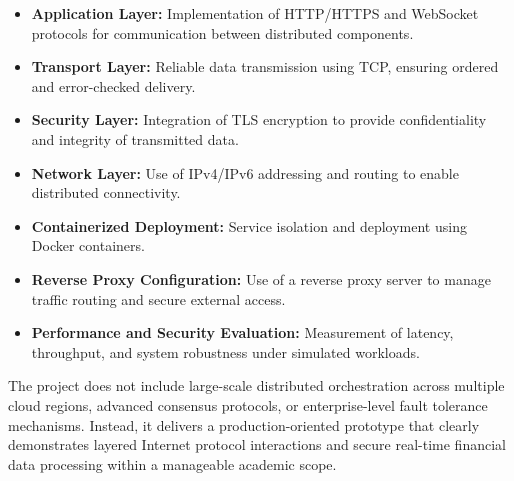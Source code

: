 \begin{itemize}
    \item \textbf{Application Layer:} Implementation of HTTP/HTTPS and WebSocket protocols for communication between distributed components.
    \item \textbf{Transport Layer:} Reliable data transmission using TCP, ensuring ordered and error-checked delivery.
    \item \textbf{Security Layer:} Integration of TLS encryption to provide confidentiality and integrity of transmitted data.
    \item \textbf{Network Layer:} Use of IPv4/IPv6 addressing and routing to enable distributed connectivity.
    \item \textbf{Containerized Deployment:} Service isolation and deployment using Docker containers.
    \item \textbf{Reverse Proxy Configuration:} Use of a reverse proxy server to manage traffic routing and secure external access.
    \item \textbf{Performance and Security Evaluation:} Measurement of latency, throughput, and system robustness under simulated workloads.
\end{itemize}

The project does not include large-scale distributed orchestration across multiple cloud regions, advanced consensus protocols, or enterprise-level fault tolerance mechanisms. Instead, it delivers a production-oriented prototype that clearly demonstrates layered Internet protocol interactions and secure real-time financial data processing within a manageable academic scope.